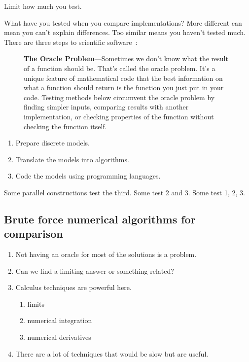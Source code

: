 \documentclass[fleqn,10pt]{olplainarticle}
\newenvironment{callout}
{
\begin{figure}
\begin{center}
\begin{minipage}{0.9\textwidth}
\begin{framed}
}
{
\end{framed}
\end{minipage}
\end{center}
\end{figure}
}
\begin{document}
Limit how much you test.

What have you tested when you compare implementations?
More different can mean you can't explain differences.
Too similar means you haven't tested much.
There are three steps to scientific software~\citep{dahlgren2005}:

\begin{callout}
\textbf{The Oracle Problem}---Sometimes
we don't know what the result of a function should be. That's called
the oracle problem. It's a unique feature of mathematical code that
the best information on what a function should return is the function you just
put in your code. Testing methods below circumvent the oracle problem
by finding simpler inputs, comparing results with another implementation,
or checking properties of the function without checking the function itself.
\end{callout}

\begin{enumerate}
  \item Prepare discrete models.
  \item Translate the models into algorithms.
  \item Code the models using programming languages.
\end{enumerate}
Some parallel constructions test the third. Some test 2 and 3. Some test 1, 2, 3.

\subsection{Brute force numerical algorithms for comparison}

\begin{enumerate}
    \item Not having an oracle for most of the solutions is a problem.

    \item Can we find a limiting answer or something related?

    \item Calculus techniques are powerful here.

    \begin{enumerate}
       \item limits

       \item numerical integration
       
       \item numerical derivatives
    \end{enumerate}
    \item There are a lot of techniques that would be slow but are useful.
\end{enumerate}
\end{document}
